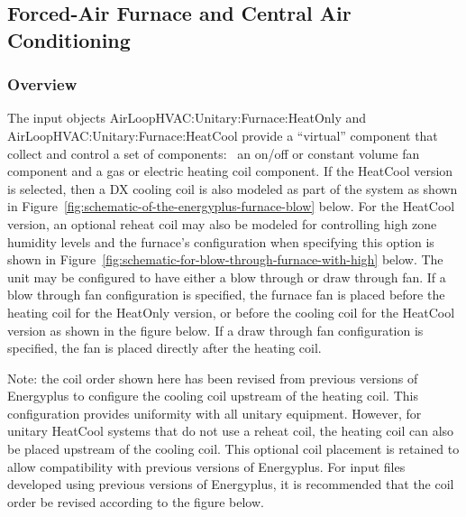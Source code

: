 \subsection{Forced-Air Furnace and Central Air Conditioning}\label{forced-air-furnace-and-central-air-conditioning}

\subsubsection{Overview}\label{overview-1}

The input objects AirLoopHVAC:Unitary:Furnace:HeatOnly and \\
AirLoopHVAC:Unitary:Furnace:HeatCool provide a ``virtual'' component that collect and control a set of components:~ an on/off or constant volume fan component and a gas or electric heating coil component. If the HeatCool version is selected, then a DX cooling coil is also modeled as part of the system as shown in Figure~\ref{fig:schematic-of-the-energyplus-furnace-blow} below. For the HeatCool version, an optional reheat coil may also be modeled for controlling high zone humidity levels and the furnace's configuration when specifying this option is shown in Figure~\ref{fig:schematic-for-blow-through-furnace-with-high} below. The unit may be configured to have either a blow through or draw through fan. If a blow through fan configuration is specified, the furnace fan is placed before the heating coil for the HeatOnly version, or before the cooling coil for the HeatCool version as shown in the figure below. If a draw through fan configuration is specified, the fan is placed directly after the heating coil.

Note: the coil order shown here has been revised from previous versions of Energyplus to configure the cooling coil upstream of the heating coil. This configuration provides uniformity with all unitary equipment. However, for unitary HeatCool systems that do not use a reheat coil, the heating coil can also be placed upstream of the cooling coil. This optional coil placement is retained to allow compatibility with previous versions of Energyplus. For input files developed using previous versions of Energyplus, it is recommended that the coil order be revised according to the figure below.

